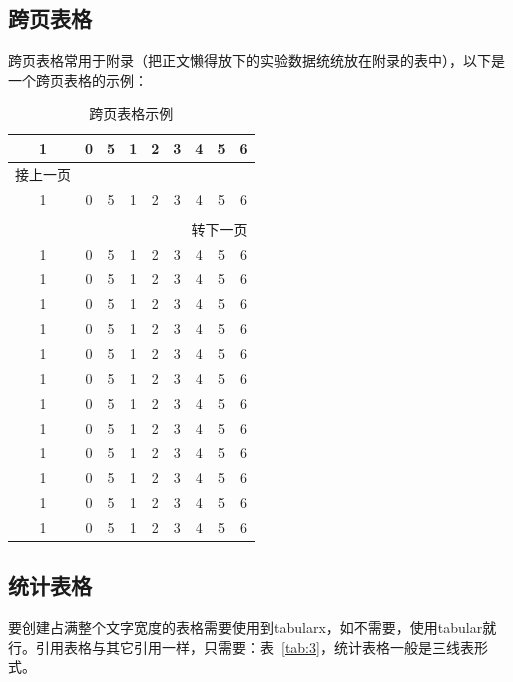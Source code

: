 \subsection{跨页表格}
跨页表格常用于附录（把正文懒得放下的实验数据统统放在附录的表中），以下是一个跨页表格的示例：

{\centering
  \begin{longtable}{ccccccccc}
  \caption{跨页表格示例} \\
  \toprule
  1     & 0 & 5  & 1  & 2  & 3  & 4  &  5 & 6 \\
  \midrule
  \endfirsthead

  \multicolumn{1}{l}{接上一页} \\
  \toprule
  1     & 0 & 5  & 1  & 2  & 3  & 4  &  5 & 6 \\
  \midrule
  \endhead

  \bottomrule
  \hline \\
  \multicolumn{9}{r}{{转下一页}} \\
  \endfoot

  \bottomrule
  \endlastfoot    

  1     & 0 & 5  & 1  & 2  & 3  & 4  &  5 & 6 \\
  1     & 0 & 5  & 1  & 2  & 3  & 4  &  5 & 6 \\
  1     & 0 & 5  & 1  & 2  & 3  & 4  &  5 & 6 \\
  1     & 0 & 5  & 1  & 2  & 3  & 4  &  5 & 6 \\
  1     & 0 & 5  & 1  & 2  & 3  & 4  &  5 & 6 \\
  1     & 0 & 5  & 1  & 2  & 3  & 4  &  5 & 6 \\
  1     & 0 & 5  & 1  & 2  & 3  & 4  &  5 & 6 \\
  1     & 0 & 5  & 1  & 2  & 3  & 4  &  5 & 6 \\
  1     & 0 & 5  & 1  & 2  & 3  & 4  &  5 & 6 \\
  1     & 0 & 5  & 1  & 2  & 3  & 4  &  5 & 6 \\
  1     & 0 & 5  & 1  & 2  & 3  & 4  &  5 & 6 \\
  1     & 0 & 5  & 1  & 2  & 3  & 4  &  5 & 6 \\

  \end{longtable}
}

\subsection{统计表格}
要创建占满整个文字宽度的表格需要使用到tabularx，如不需要，使用tabular就行。引用表格与其它引用一样，只需要：表~\ref{tab:3}，统计表格一般是三线表形式。

